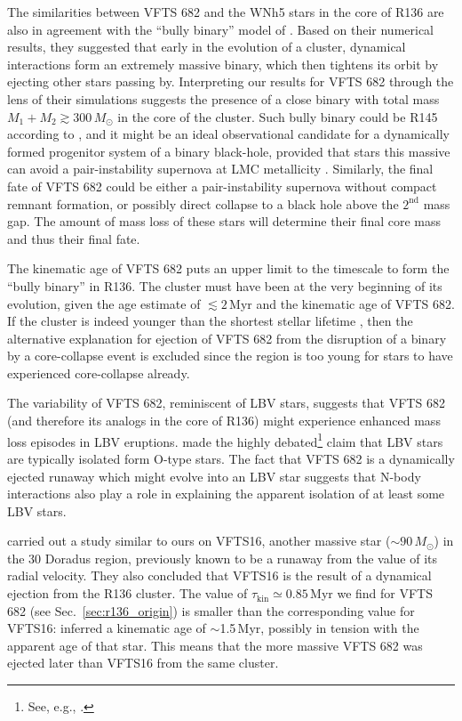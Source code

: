 \documentclass[apjl,twocolumn]{emulateapj}
\DeclareRobustCommand{\Secref}[1]{Sec.~\ref{#1}}
\begin{document}
The similarities between VFTS 682 and the WNh5 stars in the core of
R136 are also in agreement with the ``bully binary'' model of
\cite{fujii:11}. Based on their numerical results, they suggested that
early in the evolution of a cluster, dynamical interactions form an extremely
massive binary, which then tightens its orbit by ejecting other stars passing
by. Interpreting our results for VFTS 682 through the lens of their simulations
suggests the presence of a close binary with total mass
$M_1+M_2\gtrsim 300\,M_\odot$ in the core of the cluster. Such bully
binary could be R145 according to \cite{fujii:11}, and it might be an
ideal observational candidate for a dynamically formed progenitor system of
a binary black-hole, provided that stars this massive can avoid a
pair-instability supernova \cite[][]{fowler:64, rakavy:67} at LMC
metallicity \citep[see also][]{langer:07}. Similarly, the final fate of VFTS 682 could be either a
pair-instability supernova without compact remnant formation, or
possibly direct collapse to a black hole above the $2^\mathrm{nd}$
mass gap. The amount of mass loss of these stars will determine their final core
mass and thus their final fate.

The kinematic age of VFTS 682 puts an
upper limit to the timescale to form the ``bully binary'' in
R136. The cluster must have been at the very beginning of its
evolution, given the age estimate of $\lesssim 2$\,Myr
\citep[][]{crowther:10,sabbi:12} and the kinematic age of VFTS 682. If the
cluster is indeed younger than the shortest stellar lifetime
\citep[$\sim$3\,Myr, e.g.,][]{brott:11, zapartas:17}, then the alternative
explanation for ejection of VFTS 682 from the disruption of a binary
by a core-collapse event is excluded since the region is too young for stars
to have experienced core-collapse already.
 
The variability of VFTS 682, reminiscent of LBV stars, suggests
that VFTS 682 (and therefore its analogs in the core of R136) might
experience enhanced mass loss episodes in LBV eruptions. \citet{smith:15} made the highly
debated\footnote{See, e.g., \cite{humphreys:16, davidson:16, smith:16}.}
claim that LBV stars are typically isolated form O-type stars. The fact that VFTS 682 is a dynamically
ejected runaway which might evolve into an LBV star suggests that
N-body interactions also play a role in explaining the apparent
isolation of at least some LBV stars. 

\citet{lennon:18} carried out a study similar to ours on VFTS16, another
massive star ($\sim$$90\,M_\odot$) in the 30 Doradus region, previously
known to be a runaway from the value of
its radial velocity. They also concluded that VFTS16 is 
the result of a dynamical ejection from the R136 cluster. 
The value of $\tau_\mathrm{kin}\simeq0.85$\,Myr we find for VFTS 682 (see \Secref{sec:r136_origin}) is smaller
than the corresponding value for VFTS16: \cite{lennon:18} inferred a kinematic age of
$\sim$1.5\,Myr, possibly in tension with the apparent age of that star. This means that the more
massive VFTS 682 was ejected later than VFTS16 from the same cluster.
\end{document}
